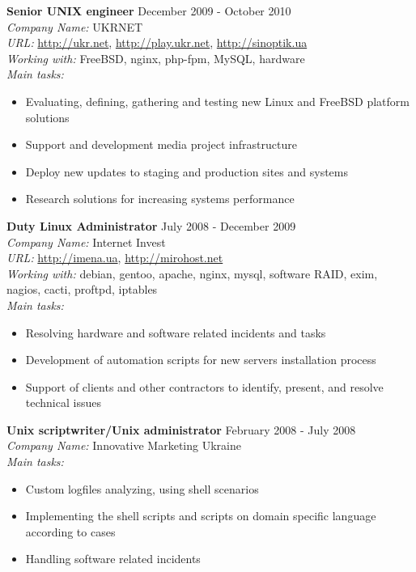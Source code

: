 \documentclass[mymargin,10pt]{res} %
\begin{document}
\begin{resume}
{\bf Senior UNIX engineer} \hfill December 2009 - October 2010 \\
{\sl Company Name:} UKRNET \\
{\sl URL:} \url{http://ukr.net}, \url{http://play.ukr.net}, \url{http://sinoptik.ua} \\
{\sl Working with:} FreeBSD, nginx, php-fpm, MySQL, hardware \\
{\sl Main tasks:}
\begin{itemize}
\item Evaluating, defining, gathering and testing new Linux and FreeBSD platform solutions
\item Support and development media project infrastructure
\item Deploy new updates to staging and production sites and systems
\item Research solutions for increasing systems performance
\end{itemize}

{\bf Duty Linux Administrator} \hfill July 2008 - December 2009 \\
{\sl Company Name:} Internet Invest \\
{\sl URL:} \url{http://imena.ua}, \url{http://mirohost.net}\\
{\sl Working with:} debian, gentoo, apache, nginx, mysql, software RAID, exim, nagios, cacti, proftpd,
iptables \\
{\sl Main tasks:}
\begin{itemize}
\item Resolving hardware and software related incidents and tasks
\item Development of automation scripts for new servers installation process
\item Support of clients and other contractors to identify, present, and resolve technical issues 
\end{itemize}

{\bf Unix scriptwriter/Unix administrator} \hfill February 2008 - July 2008 \\
{\sl Company Name:} Innovative Marketing Ukraine \\
{\sl Main tasks:}
\begin{itemize}
\item Custom logfiles analyzing, using shell scenarios
\item Implementing the shell scripts and scripts on domain specific language according to cases
\item Handling software related incidents
\end{itemize}


\end{resume}
\end{document}
